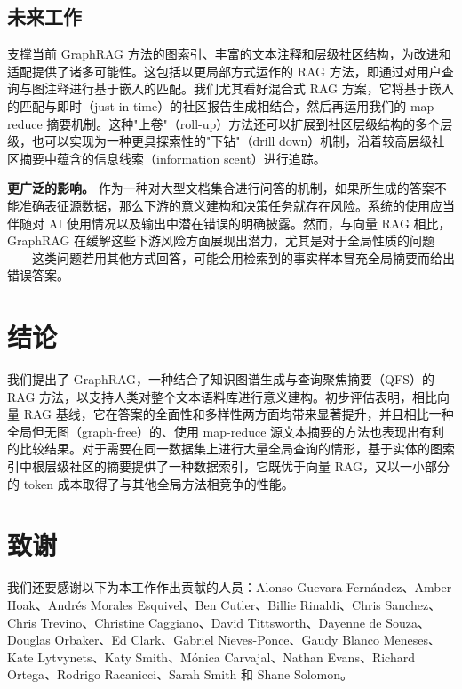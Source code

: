 \documentclass[11pt,UTF8,fontset=fandol]{ctexart}
\begin{document}
\subsection{未来工作}

支撑当前 GraphRAG 方法的图索引、丰富的文本注释和层级社区结构，为改进和适配提供了诸多可能性。这包括以更局部方式运作的 RAG 方法，即通过对用户查询与图注释进行基于嵌入的匹配。我们尤其看好混合式 RAG 方案，它将基于嵌入的匹配与即时（just-in-time）的社区报告生成相结合，然后再运用我们的 map-reduce 摘要机制。这种"上卷"（roll-up）方法还可以扩展到社区层级结构的多个层级，也可以实现为一种更具探索性的"下钻"（drill down）机制，沿着较高层级社区摘要中蕴含的信息线索（information scent）进行追踪。

\textbf{更广泛的影响。} 作为一种对大型文档集合进行问答的机制，如果所生成的答案不能准确表征源数据，那么下游的意义建构和决策任务就存在风险。系统的使用应当伴随对 AI 使用情况以及输出中潜在错误的明确披露。然而，与向量 RAG 相比，GraphRAG 在缓解这些下游风险方面展现出潜力，尤其是对于全局性质的问题——这类问题若用其他方式回答，可能会用检索到的事实样本冒充全局摘要而给出错误答案。

\section{结论}

我们提出了 GraphRAG，一种结合了知识图谱生成与查询聚焦摘要（QFS）的 RAG 方法，以支持人类对整个文本语料库进行意义建构。初步评估表明，相比向量 RAG 基线，它在答案的全面性和多样性两方面均带来显著提升，并且相比一种全局但无图（graph-free）的、使用 map-reduce 源文本摘要的方法也表现出有利的比较结果。对于需要在同一数据集上进行大量全局查询的情形，基于实体的图索引中根层级社区的摘要提供了一种数据索引，它既优于向量 RAG，又以一小部分的 token 成本取得了与其他全局方法相竞争的性能。

\section*{致谢}

我们还要感谢以下为本工作作出贡献的人员：Alonso Guevara Fernández、Amber Hoak、Andrés Morales Esquivel、Ben Cutler、Billie Rinaldi、Chris Sanchez、Chris Trevino、Christine Caggiano、David Tittsworth、Dayenne de Souza、Douglas Orbaker、Ed Clark、Gabriel Nieves-Ponce、Gaudy Blanco Meneses、Kate Lytvynets、Katy Smith、Mónica Carvajal、Nathan Evans、Richard Ortega、Rodrigo Racanicci、Sarah Smith 和 Shane Solomon。
\end{document}
